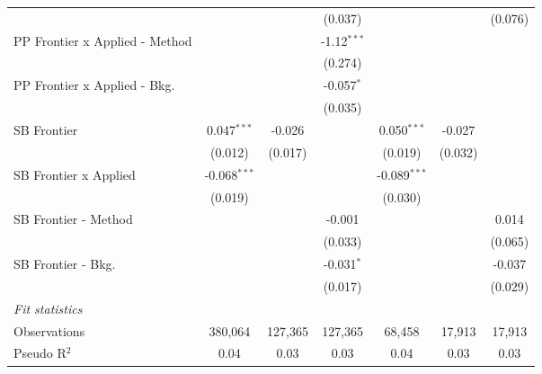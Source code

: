 \begin{tabular}{lcccccc}
                                  &                &               & (0.037)       &                &              & (0.076)\\   
   PP Frontier x Applied - Method &                &               & -1.12$^{***}$ &                &              &   \\   
                                  &                &               & (0.274)       &                &              &   \\   
   PP Frontier x Applied - Bkg.   &                &               & -0.057$^{*}$  &                &              &   \\   
                                  &                &               & (0.035)       &                &              &   \\   
   SB Frontier                    & 0.047$^{***}$  & -0.026        &               & 0.050$^{***}$  & -0.027       &   \\   
                                  & (0.012)        & (0.017)       &               & (0.019)        & (0.032)      &   \\   
   SB Frontier x Applied          & -0.068$^{***}$ &               &               & -0.089$^{***}$ &              &   \\   
                                  & (0.019)        &               &               & (0.030)        &              &   \\   
   SB Frontier - Method           &                &               & -0.001        &                &              & 0.014\\   
                                  &                &               & (0.033)       &                &              & (0.065)\\   
   SB Frontier - Bkg.             &                &               & -0.031$^{*}$  &                &              & -0.037\\   
                                  &                &               & (0.017)       &                &              & (0.029)\\   
   \midrule
   \emph{Fit statistics}\\
   Observations                   & 380,064        & 127,365       & 127,365       & 68,458         & 17,913       & 17,913\\  
   Pseudo R$^2$                   & 0.04           & 0.03          & 0.03          & 0.04           & 0.03         & 0.03\\  
   

\end{tabular}
